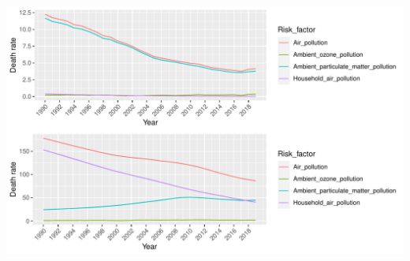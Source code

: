 \documentclass[11pt,a4paper,]{article}
\begin{document}
\includegraphics{Assignment4_files/figure-latex/unnamed-chunk-6-1.pdf}

\printbibliography[title=Conclusion:]
\end{document}
